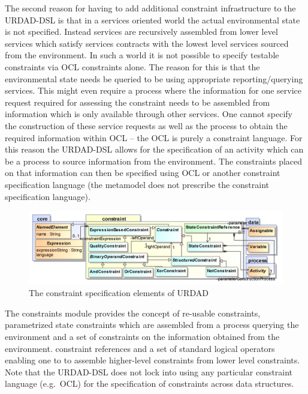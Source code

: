 The second reason for having to add additional constraint infrastructure to the URDAD-DSL is that in a services oriented world the actual environmental state is not specified. Instead services are recursively assembled from lower level services which satisfy services contracts with the lowest level services sourced from the environment. In such a world it is not possible to specify testable constraints via OCL constraints alone. The reason for this is that the environmental state needs be queried to be using appropriate reporting/querying services. This might even require a process where the information for one service request required for assessing the constraint needs to be assembled from information which is only available through other services. One cannot specify the construction of these service requests as well as the process to obtain the required information within OCL -- the OCL is purely a constraint language. For this reason the URDAD-DSL allows for the specification of an activity which can be a process to source information from the environment. The constraints placed on that information can then be specified using OCL or another constraint specification language (the metamodel does not prescribe the constraint specification language).

\begin{figure}[Htbp]
  \centering
  \includegraphics{constraint}
  \caption{The constraint specification elements of URDAD}
  \label{fig:metamodel}
\end{figure}

The constraints module provides the concept of re-usable constraints, parametrized state constraints which are assembled from a process querying the environment and a set of constraints on the information obtained from the environment. constraint references and a set of standard logical operators enabling one to to assemble higher-level constraints from lower level constraints. Note that the URDAD-DSL does not lock into using any particular constraint language (e.g.\ OCL) for the specification of constraints across data structures.


